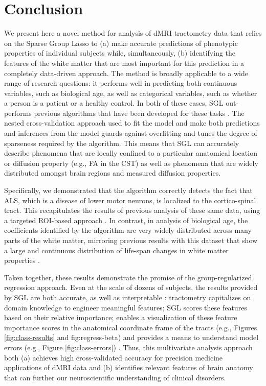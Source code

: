 \section*{Conclusion}

We present here a novel method for analysis of dMRI tractometry data that relies
on the Sparse Group Lasso \cite{simon2013sparse} to (a) make accurate
predictions of phenotypic properties of individual subjects while,
simultaneously, (b) identifying the features of the white matter that are most
important for this prediction in a completely data-driven approach. The method
is broadly applicable to a wide range of research questions: it performs well in
predicting both continuous variables, such as biological age, as well as
categorical variables, such as whether a person is a patient or a healthy
control. In both of these cases, SGL out-performs previous algorithms that have
been developed for these tasks \cite{sarica2017corticospinal, Richard2018-ux}.
The nested cross-validation approach used to fit the model and make both
predictions and inferences from the model guards against overfitting and tunes
the degree of sparseness required by the algorithm. This means that SGL can
accurately describe phenomena that are locally confined to a particular
anatomical location or diffusion property (e.g., FA in the CST) as well as
phenomena that are widely distributed amongst brain regions and measured
diffusion properties.

Specifically, we demonstrated that the algorithm correctly detects the fact that
ALS, which is a disease of lower motor neurons, is localized to the
cortico-spinal tract. This recapitulates the results of previous analysis of
these same data, using a targeted ROI-based approach
\cite{sarica2017corticospinal}. In contrast, in analysis of biological age, the
coefficients identified by the algorithm are very widely distributed across many
parts of the white matter, mirroring previous results with this dataset that
show a large and continuous distribution of life-span changes in white matter
properties \cite{yeatman2014lifespan}.

Taken together, these results demonstrate the promise of the group-regularized
regression approach. Even at the scale of dozens of subjects, the results
provided by SGL are both accurate, as well as interpretable
\cite{Murdoch2019-ax}: tractometry capitalizes on domain knowledge to engineer
meaningful features; SGL scores these features based on their relative
importance; enables a visualization of these feature importance scores in the
anatomical coordinate frame of the tracts (e.g., Figures \ref{fig:class-results}
and fig:regress-beta) and provides a means to understand model errors (e.g.,
Figure \ref{fig:class-errors}) . Thus, this multivariate analysis approach both
(a) achieves high cross-validated accuracy for precision medicine applications
of dMRI data and (b) identifies relevant features of brain anatomy that can
further our neuroscientific understanding of clinical disorders.

